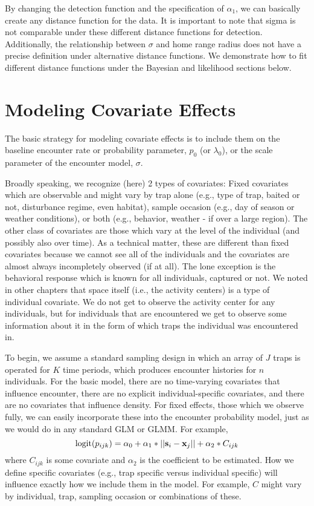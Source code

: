 By changing the detection function and the specification of
$\alpha_1$, we can basically create any distance function for the
data.  It is important to note that sigma is not comparable under
these different distance functions for detection.  Additionally, the
relationship between $\sigma$ and home range radius does not have
a precise definition under alternative distance functions.  We
demonstrate how to fit different distance functions under the Bayesian
and likelihood sections below.


\section{Modeling Covariate Effects}


The basic strategy  for modeling covariate effects is to include them
on the baseline encounter rate or probability parameter, $p_{0}$ (or
$\lambda_{0}$), or the scale parameter of the encounter model, 
$\sigma$.

Broadly speaking, we recognize (here) 2 types of covariates: Fixed
covariates which are observable and might vary by trap alone (e.g.,
type of trap, baited or not, disturbance regime, even habitat), sample
occasion (e.g., day of season or weather conditions), or both (e.g.,
behavior, weather - if over a large region).  The other class of
covariates are those which vary at the level of the individual (and
possibly also over time).  As a technical matter, these are different
than fixed covariates because we cannot see all of the individuals and
the covariates are almost always incompletely observed (if at all).
The lone exception is the behavioral response which is known for all
individuals, captured or not.  We noted in other chapters that space
itself (i.e., the activity centers) is a type of individual
covariate. We do not get to observe the activity center for any
individuals, but for individuals that are encountered we get to
observe some information about it in the form of which traps the
individual was encountered in.


To begin, we assume a standard sampling design in which an
array of $J$ traps is operated for $K$ time periods, which produces
encounter histories for $n$ individuals.  For the basic model, there
are no time-varying covariates that influence encounter, there are no
explicit individual-specific covariates, and there are no covariates
that influence density.  For fixed effects, those which we observe
fully, we can easily incorporate these into the encounter probability
model, just as we would do in any standard GLM or GLMM. For example,
\[
\mbox{logit}(p_{ijk}) = \alpha_0 + \alpha_1*||{\bf s}_{i}-{\bf x}_{j}|| +
\alpha_2*C_{ijk}
\]
where $C_{ijk}$ is some covariate and
$\alpha_2$ is the coefficient to be estimated. 
 How we define specific covariates (e.g., trap specific
versus individual specific) will influence exactly how we include them
in the model.  For example, $C$ might vary by 
individual, trap, sampling occasion or combinations of these. 


